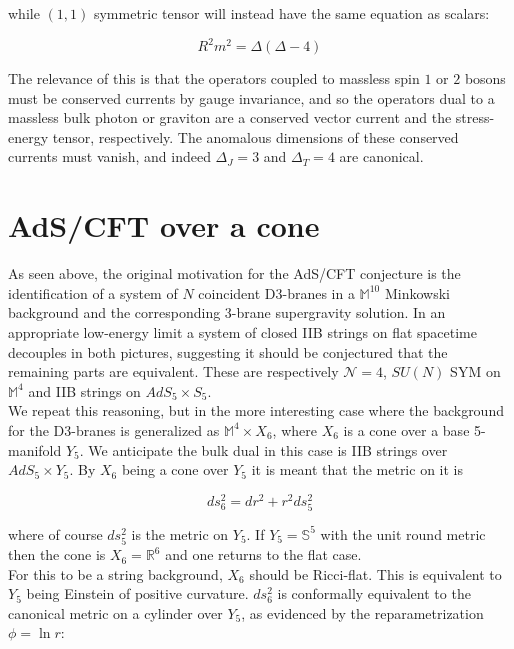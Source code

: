 while $(1,1)$ symmetric tensor will instead have the same equation as scalars:

\begin{equation}
	R^2 m^2 = \Delta (\Delta-4)
	\label{}
\end{equation}

The relevance of this is that the operators coupled to massless spin $1$ or $2$ bosons must be conserved currents by gauge invariance, and so the operators dual to a massless bulk photon or graviton are a conserved vector current and the stress-energy tensor, respectively. The anomalous dimensions of these conserved currents must vanish, and indeed $\Delta_J = 3$ and $\Delta_T = 4$ are canonical.

\section{AdS/CFT over a cone}

As seen above, the original motivation for the AdS/CFT conjecture is the identification of a system of $N$ coincident D3-branes in a $\mathbb{M}^{10}$ Minkowski background and the corresponding 3-brane supergravity solution. In an appropriate low-energy limit a system of closed IIB strings on flat spacetime decouples in both pictures, suggesting it should be conjectured that the remaining parts are equivalent. These are respectively $\mathcal{N}=4$, $SU(N)$ SYM on $\mathbb{M}^4$ and IIB strings on $AdS_5 \times S_5$.\\

We repeat this reasoning, but in the more interesting case where the background for the D3-branes is generalized as $\mathbb{M}^4 \times X_6$, where $X_6$ is a cone over a base 5-manifold $Y_5$. We anticipate the bulk dual in this case is IIB strings over $AdS_5 \times Y_5$. By $X_6$ being a cone over $Y_5$ it is meant that the metric on it is

\begin{equation}
	ds^2_6 = dr^2 + r^2 ds_5^2 \label{conemetric}
\end{equation}

where of course $ds_5^2$ is the metric on $Y_5$. If $Y_5 = \mathbb{S}^5$ with the unit round metric then the cone is $X_6 = \mathbb{R}^6$ and one returns to the flat case.\\

For this to be a string background, $X_6$ should be Ricci-flat. This is equivalent to $Y_5$ being Einstein of positive curvature. $ds_6^2$ is conformally equivalent to the canonical metric on a cylinder over $Y_5$, as evidenced by the reparametrization $\phi = \ln r$:

